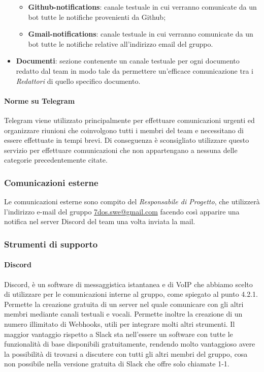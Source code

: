 \begin{itemize}
{		\begin{itemize}
			\item{\textbf{Github-notifications}: canale testuale in cui verranno comunicate da un bot tutte le notifiche provenienti da Github;}
			\item{\textbf{Gmail-notifications}: canale testuale in cui verranno comunicate da un bot tutte le notifiche relative all'indirizzo email del gruppo.}			
		\end{itemize}
	}
	\item{\textbf{Documenti}: sezione contenente un canale testuale per ogni documento redatto dal team in modo tale da permettere un'efficace comunicazione tra i \emph{Redattori} di quello specifico documento.}
 \end{itemize}
\paragraph{Norme su Telegram}\Spazio
 Telegram viene utilizzato principalmente per effettuare comunicazioni urgenti ed organizzare riunioni che coinvolgono tutti i membri del team e necessitano di essere effettuate in tempi brevi. Di conseguenza è sconsigliato utilizzare questo servizio per effettuare comunicazioni che non appartengano a nessuna delle categorie precedentemente citate.

\subsubsection{Comunicazioni esterne}
Le comunicazioni esterne sono compito del \emph{Responsabile di Progetto}, che utilizzerà l'indirizzo e-mail del gruppo \href{mailto:7dos.swe@gmail.com}{7dos.swe@gmail.com} facendo così apparire una notifica nel server Discord del team una volta inviata la mail.
\subsubsection{Strumenti di supporto}
\paragraph{Discord}\Spazio
Discord, è un software di messaggistica istantanea e di VoIP che abbiamo scelto di utilizzare per le comunicazioni interne al gruppo, come spiegato al punto 4.2.1. Permette la creazione gratuita di un server nel quale comunicare con gli altri membri mediante canali testuali e vocali. Permette inoltre la creazione di un numero illimitato di Webhooks, utili per integrare molti altri strumenti.
Il maggior vantaggio rispetto a Slack sta nell'essere un software con tutte le funzionalità di base disponibili gratuitamente, rendendo molto vantaggioso avere la possibilità di trovarsi a discutere con tutti gli altri membri del gruppo, cosa non possibile nella versione gratuita di Slack che offre solo chiamate 1-1.
